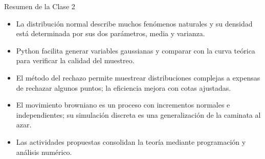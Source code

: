\begin{frame}{Resumen de la Clase 2}
\begin{itemize}
    \item La distribución normal describe muchos fenómenos naturales y su densidad está determinada por sus dos parámetros, media y varianza.
    \item Python facilita generar variables gaussianas y comparar con la curva teórica para verificar la calidad del muestreo.
    \item El método del rechazo permite muestrear distribuciones complejas a expensas de rechazar algunos puntos; la eficiencia mejora con cotas ajustadas.
    \item El movimiento browniano es un proceso con incrementos normales e independientes; su simulación discreta es una generalización de la caminata al azar.
    \item Las actividades propuestas consolidan la teoría mediante programación y análisis numérico.
\end{itemize}
\end{frame}


